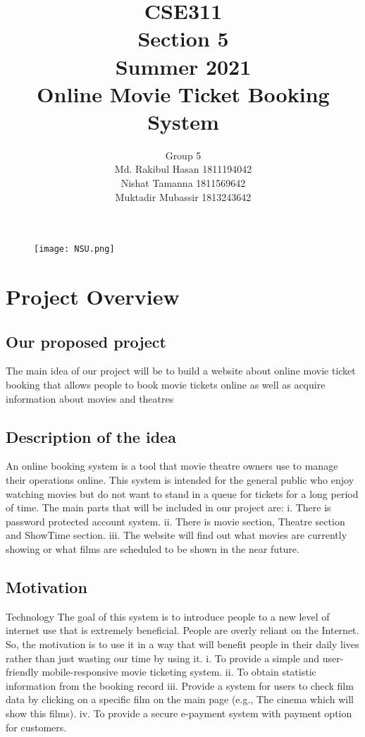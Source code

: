 \documentclass[12pt]{article}
\title{CSE311\\Section 5\\Summer 2021 \\Online Movie Ticket Booking System}
\author{Group 5\\Md. Rakibul Hasan 1811194042\\Nishat Tamanna 1811569642\\Muktadir Mubassir 1813243642}
\begin{document}
\begin{figure}[h]
\centering
\texttt{[image: NSU.png]}
\maketitle
\end{figure}
\maketitle
\makeauthor
\clearpage
\tableofcontents
\clearpage

\section{Project Overview}
\clearpage

\subsection{Our proposed project}
The main idea of our project will be to build a website about online movie ticket booking that allows people to book movie tickets online as well as acquire information about movies and theatres
\subsection{Description of the idea}
An online booking system is a tool that movie theatre owners use to manage their operations online. This system is intended for the general public who enjoy watching movies but do not want to stand in a queue for tickets for a long period of time. The main parts that will be included in our project are:
i. There is password protected account system.
ii. There is movie section, Theatre section and ShowTime section.
iii. The website will find out what movies are currently showing or what films are scheduled to be shown in the near future.
\subsection{Motivation}
Technology The goal of this system is to introduce people to a new level of internet use that is extremely beneficial. People are overly reliant on the Internet. So, the motivation is to use it in a way that will benefit people in their daily lives rather than just wasting our time by using it.
i.	To provide a simple and user-friendly mobile-responsive movie ticketing system.
ii.	To obtain statistic information from the booking record
iii.	Provide a system for users to check film data by clicking on a specific film on the main page (e.g., The cinema which will show this films).
iv.	To provide a secure e-payment system with payment option for customers.
\clearpage
\end{document}
